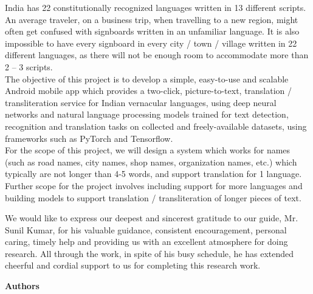 \documentclass[BTech]{srmuthesis}
\begin{document}
\abstract
\begin{doublespacing}
{\large\noindent India has 22 constitutionally recognized languages written in 13 different scripts. An average traveler, on a business trip, when travelling to a new region, might often get confused with signboards written in an unfamiliar language. It is also impossible to have every signboard in every city / town / village written in 22 different languages, as there will not be enough room to accommodate more than 2 – 3 scripts.\\

The objective of this project is to develop a simple, easy-to-use and scalable
Android mobile app which provides a two-click, picture-to-text,
translation / transliteration service for Indian vernacular languages,
using deep neural networks and natural language processing models
trained for text detection, recognition and translation tasks on
collected and freely-available datasets, using frameworks such as PyTorch and Tensorflow.\\

For the scope of this project, we will design a system which works for
names (such as road names, city names, shop names, organization
names, etc.) which typically are not longer than 4-5 words, and
support translation for 1  language. Further scope for the project
involves including support for more languages and building models to
support translation / transliteration of longer pieces of text.
}
\end{doublespacing}

\pagebreak
\acknowledgements
We would like to express our deepest and sincerest gratitude to our guide, Mr. Sunil Kumar, for
his valuable guidance, consistent encouragement, personal caring, timely help and providing us with an excellent atmosphere for doing research. All through the work, in spite of his busy schedule, he has extended cheerful and cordial support to us for completing this research work.\\



\begin{flushright}
{\bf Authors}
\end{flushright}

\begin{singlespace}
\tableofcontents
\thispagestyle{empty}

\listoftables
{}
\listoffigures
{}
\end{singlespace}
\end{document}
